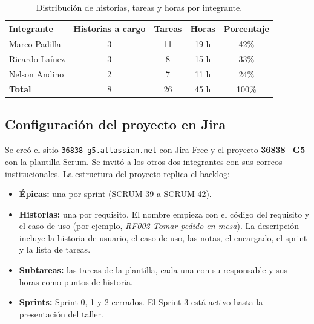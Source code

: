 \documentclass[a4paper, 11pt]{article}
\begin{document}
\begin{table}[H]
\centering
\small
\begin{tabular}{|l|c|c|c|c|}
\hline
\textbf{Integrante} & \textbf{Historias a cargo} & \textbf{Tareas} & \textbf{Horas} & \textbf{Porcentaje} \\ \hline
Marco Padilla & 3 & 11 & 19 h & 42\% \\ \hline
Ricardo Laínez & 3 & 8 & 15 h & 33\% \\ \hline
Nelson Andino & 2 & 7 & 11 h & 24\% \\ \hline
\textbf{Total} & 8 & 26 & 45 h & 100\% \\ \hline
\end{tabular}
\caption{Distribución de historias, tareas y horas por integrante.}
\label{tab:dist}
\end{table}

\subsection{Configuración del proyecto en Jira}

Se creó el sitio \texttt{36838-g5.atlassian.net} con Jira Free y el proyecto \textbf{36838\_G5} con la plantilla Scrum. Se invitó a los otros dos integrantes con sus correos institucionales. La estructura del proyecto replica el backlog:

\begin{itemize}
  \item \textbf{Épicas:} una por sprint (SCRUM-39 a SCRUM-42).
  \item \textbf{Historias:} una por requisito. El nombre empieza con el código del requisito y el caso de uso (por ejemplo, \textit{RF002 Tomar pedido en mesa}). La descripción incluye la historia de usuario, el caso de uso, las notas, el encargado, el sprint y la lista de tareas.
  \item \textbf{Subtareas:} las tareas de la plantilla, cada una con su responsable y sus horas como puntos de historia.
  \item \textbf{Sprints:} Sprint 0, 1 y 2 cerrados. El Sprint 3 está activo hasta la presentación del taller.
\end{itemize}
\end{document}
